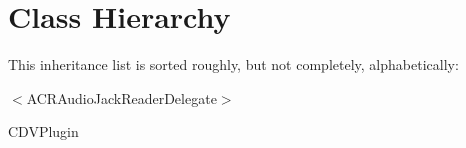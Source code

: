 \section{Class Hierarchy}
This inheritance list is sorted roughly, but not completely, alphabetically\+:\begin{DoxyCompactList}
\item $<$A\+C\+R\+Audio\+Jack\+Reader\+Delegate$>$\begin{DoxyCompactList}
\item {}
\end{DoxyCompactList}
\item C\+D\+V\+Plugin\begin{DoxyCompactList}
\item {}
\end{DoxyCompactList}
\end{DoxyCompactList}

